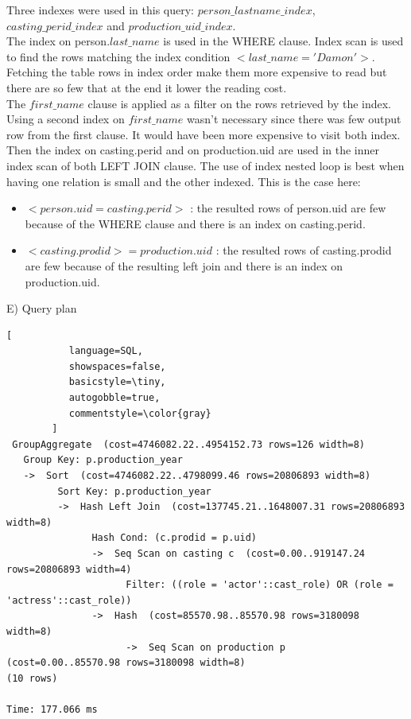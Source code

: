 \documentclass{article}
\begin{document}
Three indexes were used in this query: $person\_lastname\_index$, $casting\_perid\_index$ and $production\_uid\_index$.\\

The index on person.$last\_name$ is used in the WHERE clause. Index scan is used to find the rows matching the index condition $<last\_name = 'Damon'>$. Fetching the table rows in index order make them more expensive to read but there are so few that at the end it lower the reading cost. \\

The $first\_name$ clause is applied as a filter on the rows retrieved by the index. Using a second index on $first\_name$ wasn't necessary since there was few output row from the first clause. It would have been more expensive to visit both index. \\

Then the index on casting.perid and on production.uid are used in the inner index scan of both LEFT JOIN clause. The use of index nested loop is best when having one relation is small and the other indexed. This is the case here:
\begin{itemize}
\item $<person.uid = casting.perid>$ : the resulted rows of person.uid are few because of the WHERE clause and there is an index on casting.perid.\\
\item $<casting.prodid> = production.uid$ : the resulted rows of casting.prodid are few because of the resulting left join and there is an index on production.uid. \\
\end{itemize}

E) Query plan \\
 \begin{lstlisting}[
           language=SQL,
           showspaces=false,
           basicstyle=\tiny,
           autogobble=true,
           commentstyle=\color{gray}
        ]
 GroupAggregate  (cost=4746082.22..4954152.73 rows=126 width=8)
   Group Key: p.production_year
   ->  Sort  (cost=4746082.22..4798099.46 rows=20806893 width=8)
         Sort Key: p.production_year
         ->  Hash Left Join  (cost=137745.21..1648007.31 rows=20806893 width=8)
               Hash Cond: (c.prodid = p.uid)
               ->  Seq Scan on casting c  (cost=0.00..919147.24 rows=20806893 width=4)
                     Filter: ((role = 'actor'::cast_role) OR (role = 'actress'::cast_role))
               ->  Hash  (cost=85570.98..85570.98 rows=3180098 width=8)
                     ->  Seq Scan on production p  (cost=0.00..85570.98 rows=3180098 width=8)
(10 rows)

Time: 177.066 ms
\end{lstlisting}
\end{document}
